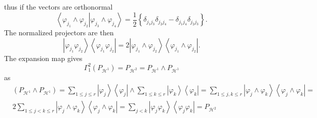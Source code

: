 \documentclass[aps,preprint]{revtex4}%
\begin{document}
thus if the vectors are orthonormal
\begin{equation}
\left\langle \left.  \varphi_{j_{1}}\wedge\varphi_{j_{2}}\right\vert
\varphi_{j_{3}}\wedge\varphi_{j_{4}}\right\rangle =\frac{1}{2}\left\{
\delta_{j_{1}j_{3}}\delta_{j_{2}j_{4}}-\delta_{j_{1}j_{4}}\delta_{j_{2}j_{3}%
}\right\}  .
\end{equation}
The normalized projectors are then
\begin{equation}
\left\vert \varphi_{j_{1}}\varphi_{j_{2}}\right\rangle \left\langle
\varphi_{j_{1}}\varphi_{j_{2}}\right\vert =2\left\vert \varphi_{j_{1}}%
\wedge\varphi_{j_{2}}\right\rangle \left\langle \varphi_{j_{1}}\wedge
\varphi_{j_{2}}\right\vert .
\end{equation}
The expansion map gives
\begin{equation}
\Gamma_{1}^{2}\left(  P_{\mathcal{H}^{1}}\right)  =P_{\mathcal{H}^{2}%
}=P_{\mathcal{H}^{1}}\wedge P_{\mathcal{H}^{1}}%
\end{equation}
as%
\begin{align}
&  \left(  P_{\mathcal{H}^{1}}\wedge P_{\mathcal{H}^{1}}\right)  =\sum_{1\leq
j\leq r}\left\vert \varphi_{j}\right\rangle \left\langle \varphi
_{j}\right\vert \wedge\sum_{1\leq k\leq r}\left\vert \varphi_{k}\right\rangle
\left\langle \varphi_{k}\right\vert =\sum_{1\leq j,k\leq r}\left\vert
\varphi_{j}\wedge\varphi_{k}\right\rangle \left\langle \varphi_{j}%
\wedge\varphi_{k}\right\vert =\\
&  2\sum_{1\leq j<k\leq r}\left\vert \varphi_{j}\wedge\varphi_{k}\right\rangle
\left\langle \varphi_{j}\wedge\varphi_{k}\right\vert =\sum_{j<k}\left\vert
\varphi_{j}\varphi_{k}\right\rangle \left\langle \varphi_{j}\varphi
_{k}\right\vert =P_{\mathcal{H}^{2}}%
\end{align}
\end{document}
